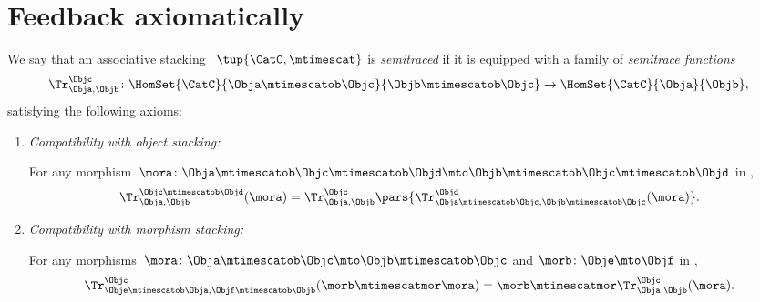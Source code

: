 \section{Feedback axiomatically}



    \begin{ctdefinition}
        \label{def:semitraced-assoc-stack-scat}
        We say that an associative stacking ~$\tup{\CatC, \mtimescat }$ is \emph{semitraced} if it is equipped with a family of \emph{semitrace functions}
        \begin{equation}
            \Tr_{\Obja,\Objb}^\Objc\colon \HomSet{\CatC}{\Obja \mtimescatob \Objc}{\Objb\mtimescatob \Objc}\to \HomSet{\CatC}{\Obja}{\Objb},
        \end{equation}
        satisfying the following axioms:
        \begin{enumerate}

            \item \emph{Compatibility with object stacking:}
            
                  For any morphism~$\mora \colon \Obja\mtimescatob \Objc \mtimescatob \Objd \mto \Objb\mtimescatob \Objc \mtimescatob \Objd$ in \CatC,
                  \begin{equation}
                      \label{eq:semicat-semitrace-vanishing_2}
                      \Tr_{\Obja,\Objb}^{\Objc\mtimescatob \Objd}(\mora)=\Tr_{\Obja,\Objb}^\Objc\pars{
                          \Tr_{\Obja \mtimescatob \Objc, \Objb \mtimescatob \Objc}^\Objd(\mora)}.
                  \end{equation}

            \item \emph{Compatibility with morphism stacking:}
            
                  For any morphisms~$\mora\colon \Obja\mtimescatob \Objc \mto \Objb\mtimescatob \Objc$ and $\morb \colon \Obje \mto \Objf$ in \CatC,
                  \begin{equation}
                      \label{eq:semicat-semitrace-superposing}
                      \Tr_{\Obje\mtimescatob \Obja,\Objf\mtimescatob \Objb}^{\Objc}(\morb \mtimescatmor \mora)=\morb \mtimescatmor \Tr_{\Obja,\Objb}^\Objc(\mora).
                  \end{equation}

        \end{enumerate}
    \end{ctdefinition}
    
